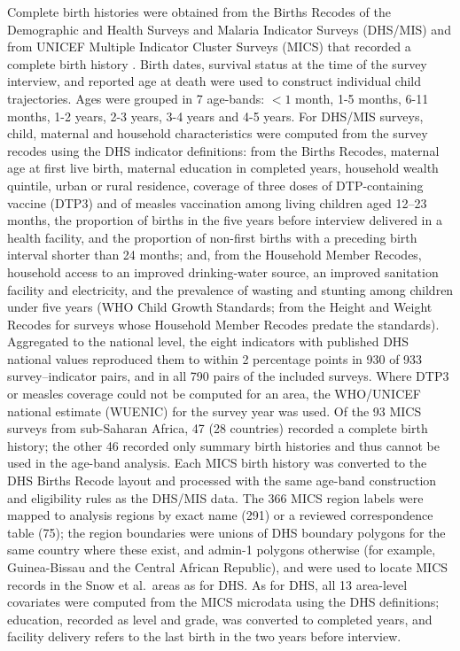 \documentclass[12pt]{article}
\begin{document}
Complete birth histories were obtained from the Births Recodes of the Demographic and Health Surveys and Malaria Indicator Surveys (DHS/MIS) \cite{dhs} and from UNICEF Multiple Indicator Cluster Surveys (MICS) that recorded a complete birth history \cite{mics}. Birth dates, survival status at the time of the survey interview, and reported age at death were used to construct individual child trajectories. Ages were grouped in 7 age-bands: $<1$ month, 1-5 months, 6-11 months, 1-2 years, 2-3 years, 3-4 years and 4-5 years. 
For DHS/MIS surveys, child, maternal and household characteristics were computed from the survey recodes using the DHS indicator definitions: from the Births Recodes, maternal age at first live birth, maternal education in completed years, household wealth quintile, urban or rural residence, coverage of three doses of DTP-containing vaccine (DTP3) and of measles vaccination among living children aged 12–23 months, the proportion of births in the five years before interview delivered in a health facility, and the proportion of non-first births with a preceding birth interval shorter than 24 months; and, from the Household Member Recodes, household access to an improved drinking-water source, an improved sanitation facility and electricity, and the prevalence of wasting and stunting among children under five years (WHO Child Growth Standards; from the Height and Weight Recodes for surveys whose Household Member Recodes predate the standards). Aggregated to the national level, the eight indicators with published DHS national values reproduced them to within 2 percentage points in 930 of 933 survey–indicator pairs, and in all 790 pairs of the included surveys. Where DTP3 or measles coverage could not be computed for an area, the WHO/UNICEF national estimate (WUENIC) for the survey year was used.
Of the 93 MICS surveys from sub-Saharan Africa, 47 (28 countries) recorded a complete birth history; the other 46 recorded only summary birth histories and thus cannot be used in the age-band analysis. Each MICS birth history was converted to the DHS Births Recode layout and processed with the same age-band construction and eligibility rules as the DHS/MIS data. The 366 MICS region labels were mapped to analysis regions by exact name (291) or a reviewed correspondence table (75); the region boundaries were unions of DHS boundary polygons for the same country where these exist, and admin-1 polygons otherwise (for example, Guinea-Bissau and the Central African Republic), and were used to locate MICS records in the Snow et al.\ areas as for DHS. As for DHS, all 13 area-level covariates were computed from the MICS microdata using the DHS definitions; education, recorded as level and grade, was converted to completed years, and facility delivery refers to the last birth in the two years before interview.
\end{document}
